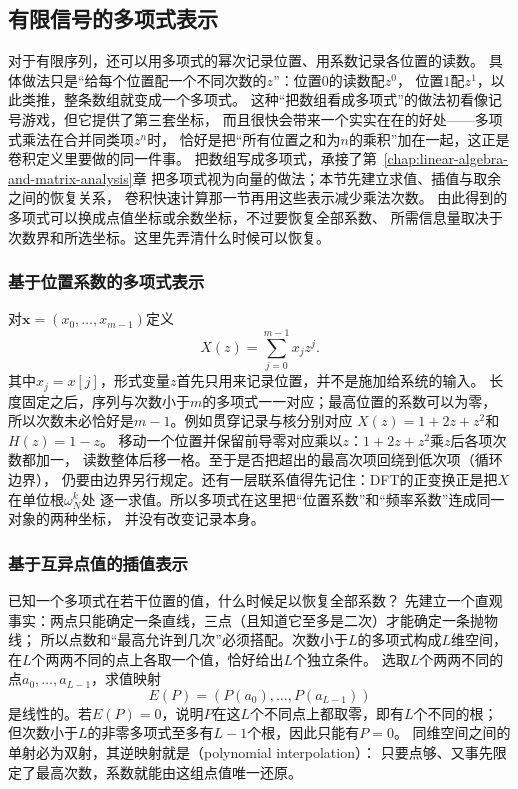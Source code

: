 \subsection{有限信号的多项式表示}
\label{sec:signal-analysis-polynomial-arithmetic}

对于有限序列，还可以用多项式的幂次记录位置、用系数记录各位置的读数。
具体做法只是“给每个位置配一个不同次数的$z$”：位置$0$的读数配$z^0$，
位置$1$配$z^1$，以此类推，整条数组就变成一个多项式。
这种“把数组看成多项式”的做法初看像记号游戏，但它提供了第三套坐标，
而且很快会带来一个实实在在的好处——多项式乘法在合并同类项$z^n$时，
恰好是把“所有位置之和为$n$的乘积”加在一起，这正是卷积定义里要做的同一件事。
把数组写成多项式，承接了第~\ref{chap:linear-algebra-and-matrix-analysis}章
把多项式视为向量的做法；本节先建立求值、插值与取余之间的恢复关系，
卷积快速计算那一节再用这些表示减少乘法次数。
由此得到的多项式可以换成点值坐标或余数坐标，不过要恢复全部系数、
所需信息量取决于次数界和所选坐标。这里先弄清什么时候可以恢复。

\subsubsection{基于位置系数的多项式表示}

对$\bm x=(x_0,\ldots,x_{m-1})$定义
\[
  X(z)=\sum_{j=0}^{m-1}x_jz^j.
\]
其中$x_j=x[j]$，形式变量$z$首先只用来记录位置，并不是施加给系统的输入。
长度固定之后，序列与次数小于$m$的多项式一一对应；最高位置的系数可以为零，
所以次数未必恰好是$m-1$。例如贯穿记录与核分别对应
$X(z)=1+2z+z^2$和$H(z)=1-z$。
移动一个位置并保留前导零对应乘以$z$：$1+2z+z^2$乘$z$后各项次数都加一，
读数整体后移一格。至于是否把超出的最高次项回绕到低次项（循环边界），
仍要由边界另行规定。还有一层联系值得先记住：DFT的正变换正是把$X$在单位根$\omega_N^k$处
逐一求值。所以多项式在这里把“位置系数”和“频率系数”连成同一对象的两种坐标，
并没有改变记录本身。

\subsubsection{基于互异点值的插值表示}

已知一个多项式在若干位置的值，什么时候足以恢复全部系数？
先建立一个直观事实：两点只能确定一条直线，三点（且知道它至多是二次）才能确定一条抛物线；
所以点数和“最高允许到几次”必须搭配。次数小于$L$的多项式构成$L$维空间，
在$L$个两两不同的点上各取一个值，恰好给出$L$个独立条件。
选取$L$个两两不同的点$a_0,\ldots,a_{L-1}$，求值映射
\[
  E(P)=(P(a_0),\ldots,P(a_{L-1}))
\]
是线性的。若$E(P)=0$，说明$P$在这$L$个不同点上都取零，即有$L$个不同的根；
但次数小于$L$的非零多项式至多有$L-1$个根，因此只能有$P=0$。
同维空间之间的单射必为双射，其逆映射就是（polynomial interpolation）：
只要点够、又事先限定了最高次数，系数就能由这组点值唯一还原。

